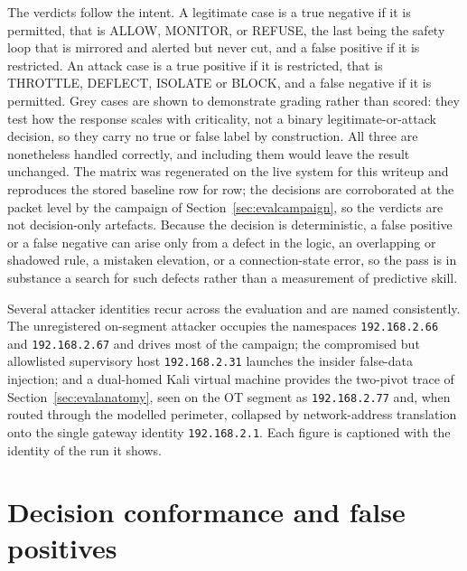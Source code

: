 The verdicts follow the intent. A legitimate case is a true negative if it is permitted, that is ALLOW, MONITOR, or REFUSE, the last being the safety loop that is mirrored and alerted but never cut, and a false positive if it is restricted. An attack case is a true positive if it is restricted, that is THROTTLE, DEFLECT, ISOLATE or BLOCK, and a false negative if it is permitted. Grey cases are shown to demonstrate grading rather than scored: they test how the response scales with criticality, not a binary legitimate-or-attack decision, so they carry no true or false label by construction. All three are nonetheless handled correctly, and including them would leave the result unchanged. The matrix was regenerated on the live system for this writeup and reproduces the stored baseline row for row; the decisions are corroborated at the packet level by the campaign of Section~\ref{sec:evalcampaign}, so the verdicts are not decision-only artefacts. Because the decision is deterministic, a false positive or a false negative can arise only from a defect in the logic, an overlapping or shadowed rule, a mistaken elevation, or a connection-state error, so the pass is in substance a search for such defects rather than a measurement of predictive skill.

Several attacker identities recur across the evaluation and are named consistently. The unregistered on-segment attacker occupies the namespaces \texttt{192.168.2.66} and \texttt{192.168.2.67} and drives most of the campaign; the compromised but allowlisted supervisory host \texttt{192.168.2.31} launches the insider false-data injection; and a dual-homed Kali virtual machine provides the two-pivot trace of Section~\ref{sec:evalanatomy}, seen on the OT segment as \texttt{192.168.2.77} and, when routed through the modelled perimeter, collapsed by network-address translation onto the single gateway identity \texttt{192.168.2.1}. Each figure is captioned with the identity of the run it shows.

\section{Decision conformance and false positives}
\label{sec:evalconformance}

